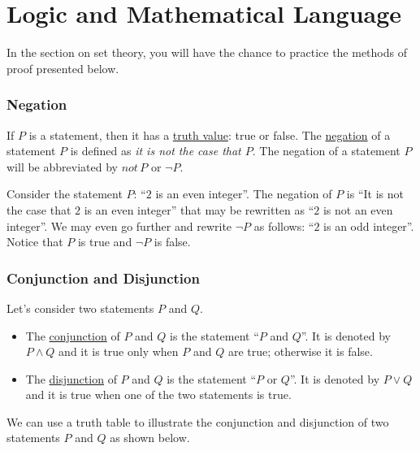 \section{Logic and Mathematical Language}

In the section on set theory, you will have the chance to practice the methods of proof presented below.

\subsubsection*{Negation}
If $P$ is a statement, then it has a \underline{truth value}: true or false. The \underline{negation} of a statement $P$ is defined as \textit{it is not the case that $P$}. The negation of a statement $P$ will be abbreviated by $not\, P$ or $\neg P$.

\begin{example}
Consider the statement $P$: ``$2$ is an even integer''. The negation of $P$ is ``It is not the case that $2$ is an even integer'' that may be rewritten as ``$2$ is not an even integer''. We may even go further and rewrite $\neg P$ as follows: ``$2$ is an odd integer''. Notice that $P$ is true and $\neg P$ is false.
\end{example}

\subsubsection*{Conjunction and Disjunction}
Let's consider two statements $P$ and $Q$.

	\begin{itemize}
		\item The \underline{conjunction} of $P$ and $Q$ is the statement ``$P$ and $Q$''. It is denoted by $P \wedge Q$ and it is true only when $P$ and $Q$ are true; otherwise it is false.
		\item The \underline{disjunction} of $P$ and $Q$ is the statement ``$P$ or $Q$''. It is denoted by $P \vee Q$ and it is true when one of the two statements is true.
	\end{itemize}

We can use a truth table to illustrate the conjunction and disjunction of two statements $P$ and $Q$ as shown below.

